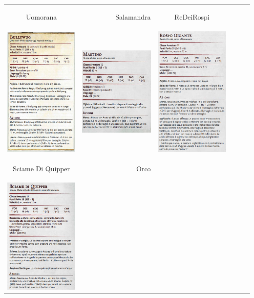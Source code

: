 \documentclass{article}
\begin{document}
\begin{table}
\begin{tabular}{|cr cr cr|}
        \\
        \hypertarget{uomorana}{Uomorana} & Salamandra & \hypertarget{re}{ReDeiRospi}\\
        \includegraphics[width=4cm, height = 6 cm]{../Mostri/Bullywug.PNG} &  \includegraphics[width=4cm, height = 6 cm]{../Mostri/Mastino.PNG}&
        \includegraphics[width=4cm, height = 6 cm]{../Mostri/ReDeiRospi.PNG}\\
        \hypertarget{sciame}{Sciame Di Quipper} & \hypertarget{orco}{Orco}\\
        \includegraphics[width=4cm, height = 6 cm]{../Mostri/Sciame di Quippers.PNG} &

\end{tabular}
\end{table}
\end{document}
